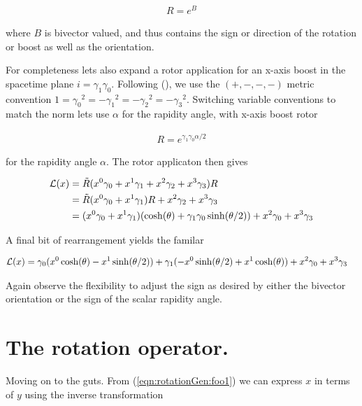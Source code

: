 \begin{align}\label{eqn:rotationGen:foo33}
R = e^{B}
\end{align}

where $B$ is bivector valued, and thus contains the sign or direction of the rotation or boost as well as the orientation.


For completeness lets also expand a rotor application for an x-axis boost in the spacetime plane $i = \gamma_1 \gamma_0$.  Following (\cite{doran2003gap}), we use the $(+,-,-,-)$ metric convention $1 = {\gamma_0}^2 = -{\gamma_1}^2 = -{\gamma_2}^2 = -{\gamma_3}^2$.  Switching variable conventions to match the norm lets use $\alpha$ for the rapidity angle, with x-axis boost rotor

\begin{align}\label{eqn:rotationGen:foo34}
R = e^{\gamma_1 \gamma_0 \alpha/2}
\end{align}

for the rapidity angle $\alpha$.  The rotor applicaton then gives

\begin{align*}
\mathcal{L}(x) 
&= \tilde{R} (x^0 \gamma_0 + x^1 \gamma_1 + x^2 \gamma_2 + x^3 \gamma_3 ) R \\
&=
\tilde{R} (x^0 \gamma_0 + x^1 \gamma_1) R + x^2 \gamma_2 + x^3 \gamma_3 \\
&=
(x^0 \gamma_0 + x^1 \gamma_1) (\cosh(\theta) + \gamma_1 \gamma_0 \sinh(\theta/2)) + x^2 \gamma_0 + x^3 \gamma_3 \\
\end{align*}

A final bit of rearrangement yields the familar 

\begin{align}\label{eqn:rotationGen:foo35}
\mathcal{L}(x)
&=
\gamma_0 (x^0 \cosh(\theta) - x^1 \sinh(\theta/2))
+ \gamma_1 ( -x^0 \sinh(\theta/2) + x^1 \cosh(\theta))
+ x^2 \gamma_0 + x^3 \gamma_3 
\end{align}

Again observe the flexibility to adjust the sign as desired by either the bivector orientation or the sign of the scalar rapidity angle.

\section{The rotation operator.}

Moving on to the guts.  From (\ref{eqn:rotationGen:foo1}) we can express $x$ in terms of $y$ using the inverse transformation

